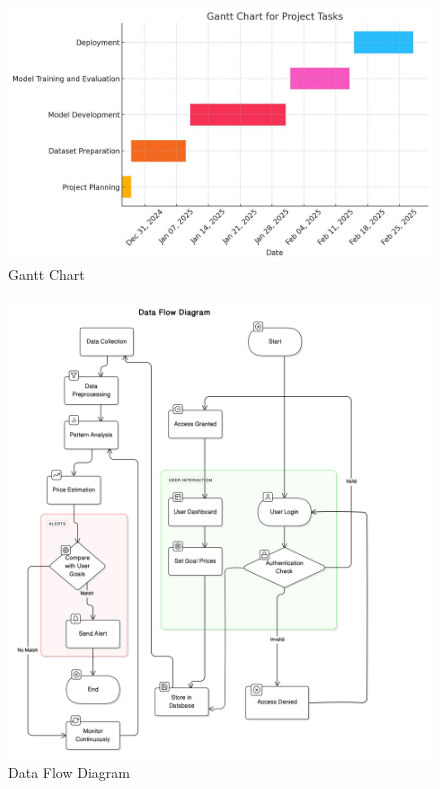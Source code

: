 \begin{figure}[h]
    \centering
    \includegraphics[width=1\textwidth]{Graphics/gantt.jpeg}  
    \caption{Gantt Chart}
    \label{fig:example}  
\end{figure}
\begin{figure}[h]
    \centering
    \includegraphics[width=1.2\textwidth]{Graphics/data_flow.png}  
    \caption{Data Flow Diagram}
    \label{fig:example}  
\end{figure}
